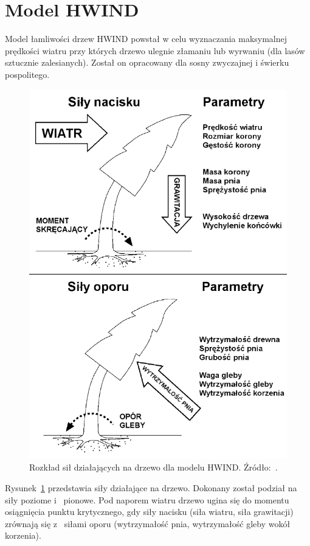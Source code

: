 \section{Model HWIND}

Model łamliwości drzew HWIND powstał w celu wyznaczania maksymalnej prędkości wiatru przy których drzewo ulegnie złamaniu lub wyrwaniu (dla lasów sztucznie zalesianych). Został on opracowany dla sosny zwyczajnej i świerku pospolitego.

\begin{figure}[!h]
\center
\includegraphics[scale=0.45]{HWIND1}
\caption{Rozkład sił działających na drzewo dla modelu HWIND. Źródło:~\cite{chm_mgza}.}
\label{fig:hwind_forces}
\end{figure} 

Rysunek~\ref{fig:hwind_forces} przedstawia siły działające na drzewo. Dokonany został podział na siły poziome i ~pionowe.
Pod naporem wiatru drzewo ugina się do momentu osiągnięcia punktu krytycznego, gdy siły nacisku (siła wiatru, siła grawitacji) zrównają się z ~siłami oporu (wytrzymałość pnia, wytrzymałość gleby wokół korzenia).

